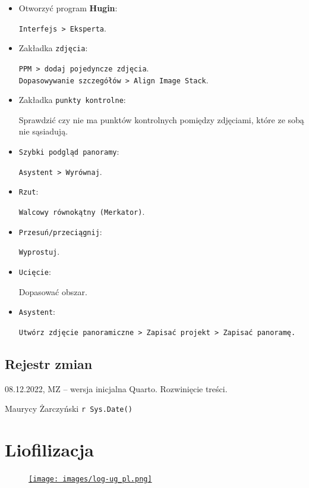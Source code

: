 \documentclass[
  letterpaper,
  DIV=11,
  numbers=noendperiod]{scrreprt}
\begin{document}
\begin{itemize}
\item
  Otworzyć program \textbf{Hugin}:

  \texttt{Interfejs\ \textgreater{}\ Eksperta}.
\item
  Zakładka \texttt{zdjęcia}:

  \texttt{PPM\ \textgreater{}\ dodaj\ pojedyncze\ zdjęcia}.\\
  \texttt{Dopasowywanie\ szczegółów\ \textgreater{}\ Align\ Image\ Stack}.
\item
  Zakładka \texttt{punkty\ kontrolne}:

  Sprawdzić czy nie ma punktów kontrolnych pomiędzy zdjęciami, które ze
  sobą nie sąsiadują.
\item
  \texttt{Szybki\ podgląd\ panoramy}:

  \texttt{Asystent\ \textgreater{}\ Wyrównaj}.
\item
  \texttt{Rzut}:

  \texttt{Walcowy\ równokątny\ (Merkator)}.
\item
  \texttt{Przesuń/przeciągnij}:

  \texttt{Wyprostuj}.
\item
  \texttt{Ucięcie}:

  Dopasować obszar.
\item
  \texttt{Asystent}:

  \texttt{Utwórz\ zdjęcie\ panoramiczne\ \textgreater{}\ Zapisać\ projekt\ \textgreater{}\ Zapisać\ panoramę.}
\end{itemize}

\hypertarget{pagebreak-rejestr-zmian-3}{%
\section{\texorpdfstring{\newpage{}Rejestr
zmian}{Rejestr zmian}}\label{pagebreak-rejestr-zmian-3}}

08.12.2022, MZ -- wersja inicjalna Quarto. Rozwinięcie treści.

Maurycy Żarczyński \texttt{r\ Sys.Date()}

\hypertarget{liofilizacja}{%
\chapter{Liofilizacja}\label{liofilizacja}}

\begin{figure}

\href{https://geomorfologia.ug.edu.pl}{\texttt{[image: images/log-ug\_pl.png]}}

\end{figure}
\end{document}
